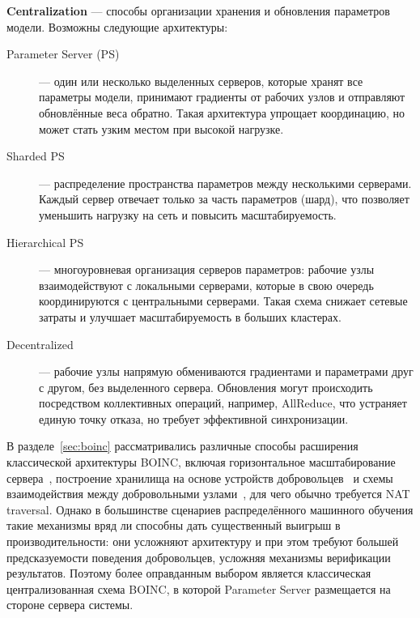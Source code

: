 \documentclass[a4paper,12pt]{extarticle}
\begin{document}
    \textbf{Centralization} — способы организации хранения и обновления параметров модели.
    Возможны следующие архитектуры:
    \begin{description}
        \item[Parameter Server (PS)] — один или несколько выделенных серверов, которые хранят все параметры модели, принимают градиенты от рабочих узлов и отправляют обновлённые веса обратно.
        Такая архитектура упрощает координацию, но может стать узким местом при высокой нагрузке.
        \item[Sharded PS] — распределение пространства параметров между несколькими серверами.
        \newline Каждый сервер отвечает только за часть параметров (шард), что позволяет уменьшить нагрузку на сеть и повысить масштабируемость.
        \item[Hierarchical PS] — многоуровневая организация серверов параметров: рабочие узлы взаимодействуют с локальными серверами, которые в свою очередь координируются с центральными серверами.
        Такая схема снижает сетевые затраты и улучшает масштабируемость в больших кластерах.
        \item[Decentralized] — рабочие узлы напрямую обмениваются градиентами и параметрами друг с другом, без выделенного сервера.
        Обновления могут происходить посредством коллективных операций, например, AllReduce, что устраняет единую точку отказа, но требует эффективной синхронизации.
    \end{description}

    В разделе~\ref{sec:boinc} рассматривались различные способы расширения классической архитектуры BOINC, включая горизонтальное масштабирование сервера~\cite{anderson2020boinc}, построение хранилища на основе устройств добровольцев~\cite{alonso2017new,costa2008optimizing} и схемы взаимодействия между добровольными узлами~\cite{alonso2017new}, для чего обычно требуется NAT traversal.
    Однако в большинстве сценариев распределённого машинного обучения такие механизмы вряд ли способны дать существенный выигрыш в производительности: они усложняют архитектуру и при этом требуют большей предсказуемости поведения добровольцев, усложняя механизмы верификации результатов.
    Поэтому более оправданным выбором является классическая централизованная схема BOINC, в которой Parameter Server размещается на стороне сервера системы.
\end{document}
